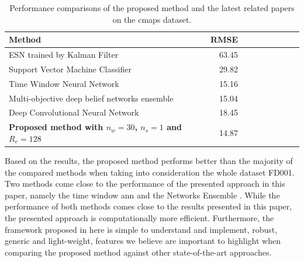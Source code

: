 \begin{table}[!htb]
\centering
\begin{tabular}{l | r r r r | r r r r}
	\hline	
	Method & RMSE \\
  	\hline
  	ESN trained by Kalman Filter \cite{Peng2012} & 63.45\\
  	Support Vector Machine Classifier \cite{Louen2013} & 29.82\\
  	Time Window Neural Network \cite{Lim2016} & 15.16\\
  	Multi-objective deep belief networks ensemble \cite{Zhang2016} & 15.04\\
  	Deep Convolutional Neural Network \cite{Babu2016} & 18.45\\
  	\textbf{Proposed method with $n_w = 30$, $n_s=1$ and $R_e = 128$} & 14.87\\
  	\hline
\end{tabular}
\caption{Performance comparisons of the proposed method and the latest related papers on the \gls{cmaps} dataset.}
\label{table:results_comparison}
\end{table}

Based on the results, the proposed method performs better than the majority of the compared methods when taking into consideration the whole dataset FD001. Two methods come close to the performance of the presented approach in this paper, namely the time window \gls{ann} \cite{Lim2016} and the Networks Ensemble \cite{Zhang2016}. While the performance of both methods comes close to the results presented in this paper, the presented approach is computationally more efficient. Furthermore, the framework proposed in here is simple to understand and implement, robust, generic and light-weight, features we believe are important to highlight when comparing the proposed method against other state-of-the-art approaches.

